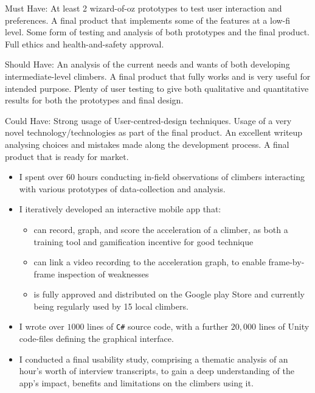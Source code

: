 Must Have: At least 2 wizard-of-oz prototypes to test user interaction and preferences.
A final product that implements some of the features at a low-fi level. Some form of testing and analysis of both prototypes and the final product.
Full ethics and health-and-safety approval.


Should Have:
An analysis of the current needs and wants of both developing intermediate-level climbers.
A final product that fully works and is very useful for intended purpose.
Plenty of user testing to give both qualitative and quantitative results for both the prototypes and final design.

Could Have: Strong usage of User-centred-design techniques.
Usage of a very novel technology/technologies as part of the final product.
An excellent writeup analysing choices and mistakes made along the development process.
A final product that is ready for market.









\noindent
\begin{itemize}
\item I spent over $60$ hours conducting in-field observations of climbers interacting with various prototypes of data-collection and analysis.
\item I iteratively developed an interactive mobile app that: \begin{itemize}
      \item can record, graph, and score the acceleration of a climber, as both a training tool and gamification incentive for good technique
      \item can link a video recording to the acceleration graph, to enable frame-by-frame inspection of weaknesses
      \item is fully approved and distributed on the Google play Store and currently being regularly used by 15 local climbers.
\end{itemize}
\item I wrote over $1000$ lines of \verb|C#| source code, with a further $20,000$ lines of Unity code-files defining the graphical interface.
\item I conducted a final usability study, comprising a thematic analysis of an hour's worth of interview transcripts, to gain a deep understanding of the app's impact, benefits and limitations on the climbers using it. 
\end{itemize}